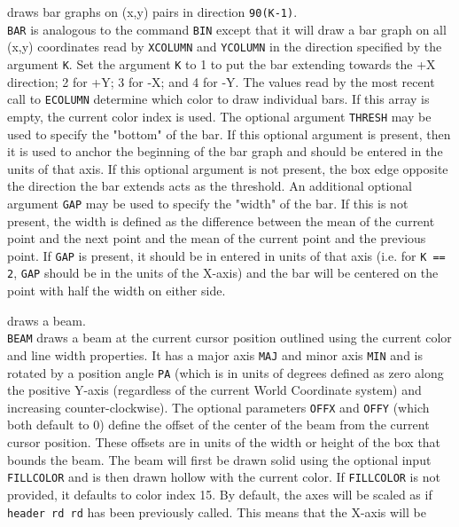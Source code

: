 \item [{\tt BAR K [THRESH [GAP]] } --] draws bar graphs on (x,y) pairs in direction {\tt 90(K-1)}.\\
	{\tt BAR} is analogous to the command
	{\tt BIN} except that it will draw a
	bar graph on all (x,y) coordinates read by
	{\tt XCOLUMN} and
	{\tt YCOLUMN} in the direction
	specified by the argument {\tt K}.  Set the argument
	{\tt K} to 1 to put the bar extending towards the +X
	direction; 2 for +Y; 3 for -X; and 4 for -Y.  The values read
	by the most recent call to {\tt ECOLUMN}
	determine which color to draw individual bars.  If this array is
	empty, the current color index is used.  The optional argument
	{\tt THRESH} may be used to specify the "bottom" of the
	bar.  If this optional argument is present, then it is used to
	anchor the beginning of the bar graph and should be entered in
	the units of that axis.  If this optional argument is not
	present, the box edge opposite the direction the bar extends
	acts as the threshold.  An additional optional argument
	{\tt GAP} may be used to specify the "width" of the bar.
	If this is not present, the width is defined as the difference
	between the mean of the current point and the next point and the
	mean of the current point and the previous point.  If
	{\tt GAP} is present, it should be in entered in units of
	that axis (i.e.  for {\tt K == 2}, {\tt GAP}
	should be in the units of the X-axis) and the bar will be
	centered on the point with half the width on either side.
\item [{\tt BEAM MAJ MIN PA [OFFX OFFY [SCALE [FILLCOLOR [BGRECT]]]] } --] draws a beam.\\
	{\tt BEAM} draws a beam at the current cursor position
	outlined using the current color and line width properties.
	It has a major axis {\tt MAJ} and minor axis
	{\tt MIN} and is rotated by a position angle {\tt PA}
	(which is in units of degrees defined as zero along the positive
	Y-axis (regardless of the current World Coordinate system) and
	increasing counter-clockwise).  The optional parameters
	{\tt OFFX} and {\tt OFFY} (which both default to 0)
	define the offset of the center of the beam from the current
	cursor position.  These offsets are in units of the width or
	height of the box that bounds the beam.  The beam will first be
	drawn solid using the optional input {\tt FILLCOLOR} and is
	then drawn hollow with the current color.  If {\tt FILLCOLOR}
	is not provided, it defaults to color index 15.
	By default, the axes will be scaled as if {\tt header rd rd}
	has been previously called.  This means that the X-axis will be
